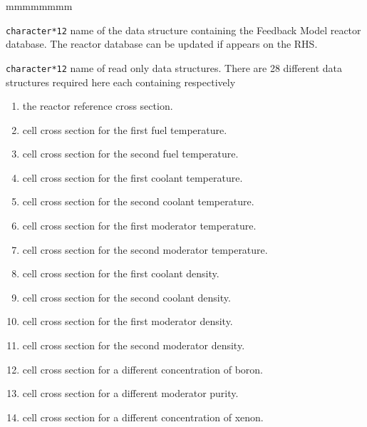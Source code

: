 \begin{ListeDeDescription}{mmmmmmmm} 

\item[\dusa{CFCNAM}] \verb|character*12| name of the  data structure containing
the Feedback Model reactor database. The reactor database can be updated if 
appears on the RHS.

\item[\dusa{CPONAM}] \verb|character*12| name of read only  data structures. There
are 28 different  data structures required here each containing respectively

\begin{enumerate}

\item the reactor reference cross section.

\item cell cross section for the first fuel temperature.

\item cell cross section for the second fuel temperature.

\item cell cross section for the first coolant temperature.

\item cell cross section for the second coolant temperature.

\item cell cross section for the first moderator temperature.

\item cell cross section for the second moderator temperature. 

\item cell cross section for the first coolant density. 

\item cell cross section for the second coolant density. 

\item cell cross section for the first moderator density.

\item cell cross section for the second moderator density.

\item cell cross section for a different concentration of boron. 

\item cell cross section for a different moderator purity. 

\item cell cross section for a different concentration of xenon. 


\end{enumerate}
\end{ListeDeDescription}
